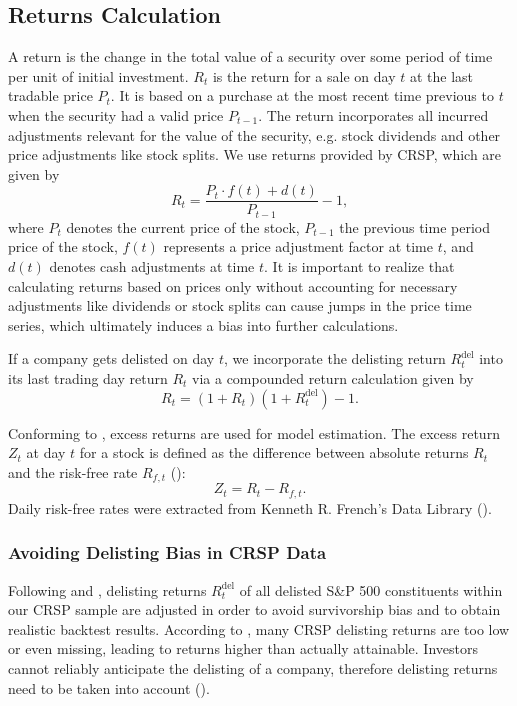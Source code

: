 \documentclass[11pt,a4paper]{article}
\def \indexName {S\&P 500}
\begin{document}
\subsection{Returns Calculation}

A return is the change in the total value of a security over some period of time per unit of initial investment. $R_t$ is the return for a sale on day $t$ at the last tradable price $P_t$. It is based on a purchase at the most recent time previous to $t$ when the security had a valid price $P_{t-1}$. The return incorporates all incurred adjustments relevant for the value of the security, e.g. stock dividends and other price adjustments like stock splits. We use returns provided by CRSP, which are given by
\begin{equation}
    R_t = \dfrac{P_t \cdot f(t) + d(t)}{P_{t-1}} - 1,
\end{equation}
where $P_t$ denotes the current price of the stock, $P_{t-1}$ the previous time period price of the stock, $f(t)$ represents a price adjustment factor at time $t$, and $d(t)$ denotes cash adjustments at time $t$. It is important to realize that calculating returns based on prices only without accounting for necessary adjustments like dividends or stock splits can cause jumps in the price time series, which ultimately induces a bias into further calculations.

If a company gets delisted on day $t$, we incorporate the delisting return $R_t^\textrm{del}$ into its last trading day return $R_t$ via a compounded return calculation given by
\begin{equation}
R_t = (1 + R_t)(1 + R_t^\textrm{del}) - 1.
\end{equation}


Conforming to , excess returns are used for model estimation. The excess return $Z_t$ at day $t$ for a stock is defined as the difference between absolute returns $R_t$ and the risk-free rate $R_{f,t}$ ():
\begin{equation}
    Z_t = R_t - R_{f,t}.
\end{equation}
Daily risk-free rates were extracted from Kenneth R. French's Data Library ().



\subsubsection{Avoiding Delisting Bias in CRSP Data}

Following  and , delisting returns $R_t^\textrm{del}$ of all delisted \indexName{} constituents within our CRSP sample are adjusted in order to avoid survivorship bias and to obtain realistic backtest results. According to , many CRSP delisting returns are too low or even missing, leading to returns higher than actually attainable. Investors cannot reliably anticipate the delisting of a company, therefore delisting returns need to be taken into account ().
\end{document}
